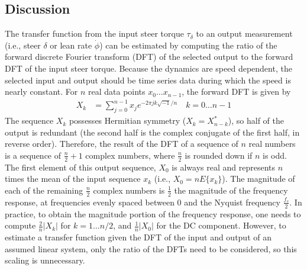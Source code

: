 \subsection{Discussion} \label{rb:subsec:discuss}
The transfer function from the input steer torque $\tau_\delta$ to an output
measurement (i.e., steer $\delta$ or lean rate $\dot{\phi}$) can be estimated
by computing the ratio of the forward discrete Fourier transform (DFT) of the
selected output to the forward DFT of the input steer torque.  Because the
dynamics are speed dependent, the selected input and output should be time series
data during which the speed is nearly constant. For $n$ real data points $x_0
\ldots x_{n-1}$, the forward DFT is given by
\begin{align} X_k &=
  \sum_{j=0}^{n-1} x_j e^{-2 \pi j k \sqrt{-1} / n} \quad k = 0 \ldots n-1
  \label{rb:dft}
\end{align}
The sequence $X_k$ possesses Hermitian symmetry ($X_k = X_{n-k}^*$), so half of
the output is redundant (the second half is the complex conjugate of the first
half, in reverse order). Therefore, the result of the DFT of a sequence of $n$
real numbers is a sequence of $\frac{n}{2} + 1$ complex numbers, where
$\frac{n}{2}$ is rounded down if $n$ is odd. The first element of this output
sequence, $X_0$ is always real and represents $n$ times the mean of the input
sequence $x_k$ (i.e., $X_0 = n E\{x_k\}$). The magnitude of each of the
remaining $\frac{n}{2}$ complex numbers is $\frac{1}{2}$ the magnitude of the
frequency response, at frequencies evenly spaced between 0 and the Nyquist
frequency $\frac{f_s}{2}$.  In practice, to obtain the magnitude portion of the
frequency response, one needs to compute $\frac{2}{n} |X_k|$ for $k = 1 \ldots
n/2$, and $\frac{1}{n} |X_0|$ for the DC component. However, to estimate a
transfer function given the DFT of the input and output of an assumed linear
system, only the ratio of the DFTs need to be considered, so this scaling is
unnecessary.

